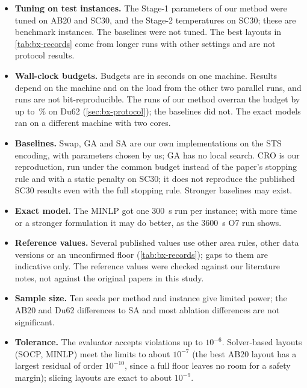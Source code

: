 \begin{itemize}
\item \textbf{Tuning on test instances.} The Stage-1 parameters of our method were tuned on AB20 and SC30, and the
Stage-2 temperatures on SC30; these are benchmark instances. The baselines were not tuned. The best layouts in
\cref{tab:bx-records} come from longer runs with other settings and are not protocol results.
\item \textbf{Wall-clock budgets.} Budgets are in seconds on one machine. Results depend on the machine and on
the load from the other two parallel runs, and runs are not bit-reproducible. The runs of our method overran the
budget by up to \bxOverOursMaxPctDusixtytwo\,\% on Du62 (\cref{sec:bx-protocol}); the baselines did not. The exact
models ran on a different machine with two cores.
\item \textbf{Baselines.} Swap, GA and SA are our own implementations on the STS encoding, with parameters
chosen by us; GA has no local search. CRO is our reproduction, run under the common budget instead of the
paper's stopping rule and with a static penalty on SC30; it does not reproduce the published SC30 results even
with the full stopping rule. Stronger baselines may exist.
\item \textbf{Exact model.} The MINLP got one 300~s run per instance; with more time or a stronger formulation it
may do better, as the 3600~s O7 run shows.
\item \textbf{Reference values.} Several published values use other area rules, other data versions or an
unconfirmed floor (\cref{tab:bx-records}); gaps to them are indicative only. The reference values were checked
against our literature notes, not against the original papers in this study.
\item \textbf{Sample size.} Ten seeds per method and instance give limited power; the AB20 and Du62 differences
to SA and most ablation differences are not significant.
\item \textbf{Tolerance.} The evaluator accepts violations up to $10^{-6}$. Solver-based layouts (SOCP, MINLP) meet
the limits to about $10^{-7}$ (the best AB20 layout has a largest residual of order $10^{-10}$, since a full floor
leaves no room for a safety margin); slicing layouts are exact to about $10^{-9}$.
\end{itemize}
